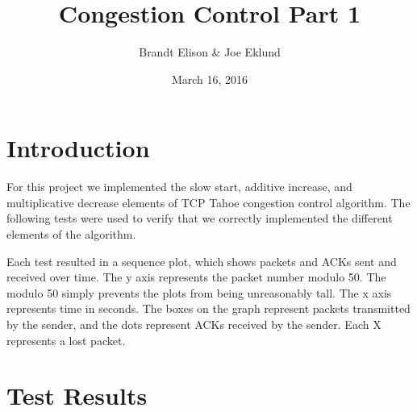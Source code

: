 \documentclass[11pt]{article}
\begin{document}
\lstset{
  language=Python,
  basicstyle=\small,          %
  keywordstyle=\bfseries,
  identifierstyle=,           %
  commentstyle=,              %
  stringstyle=\ttfamily,      %
  showstringspaces=false,     %
  numbers=left,
  numberstyle=\tiny,
  numbersep=5pt,
  frame=tb
}

\title{Congestion Control Part 1}

\author{Brandt Elison & Joe Eklund}

\date{March 16, 2016}

\maketitle

\section{Introduction}

For this project we implemented the slow start, additive increase, and multiplicative decrease elements of TCP Tahoe congestion control algorithm. The following tests were used to verify that we correctly implemented the different elements of the algorithm.

Each test resulted in a sequence plot, which shows packets and ACKs sent and received over time. The y axis represents the packet number modulo 50. The modulo 50 simply prevents the plots from being unreasonably tall. The x axis represents time in seconds. The boxes on the graph represent packets transmitted by the sender, and the dots represent ACKs received by the sender. Each X represents a lost packet.

\section{Test Results}
\end{document}
